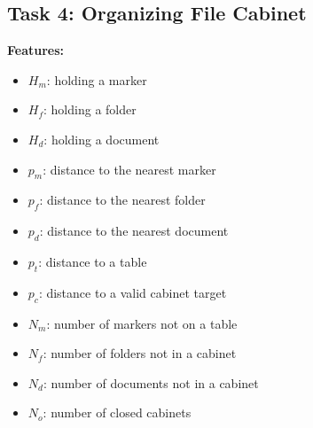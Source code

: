 \subsection{Task 4: Organizing File Cabinet}

\textbf{Features:}
\begin{itemize}[noitemsep]
    \item $H_m$: holding a marker
    \item $H_f$: holding a folder
    \item $H_d$: holding a document
    \item $p_m$: distance to the nearest marker
    \item $p_f$: distance to the nearest folder
    \item $p_d$: distance to the nearest document
    \item $p_t$: distance to a table
    \item $p_c$: distance to a valid cabinet target
    \item $N_m$: number of markers not on a table
    \item $N_f$: number of folders not in a cabinet
    \item $N_d$: number of documents not in a cabinet
    \item $N_o$: number of closed cabinets
\end{itemize}

